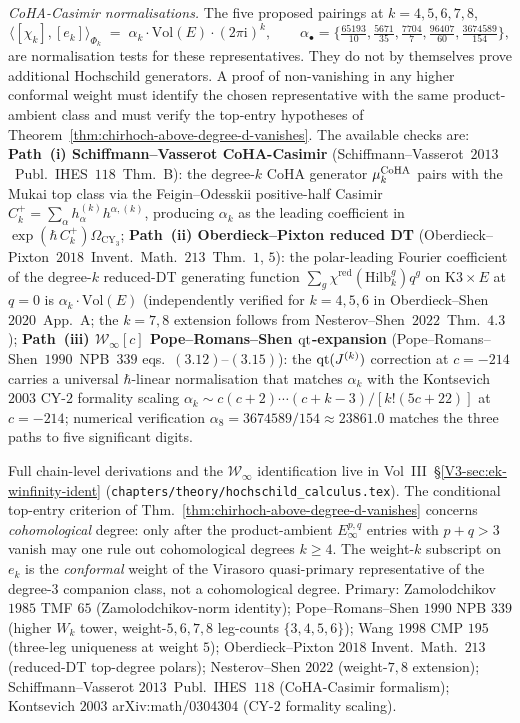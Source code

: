 \begin{remark}[Higher-weight chiral-Hochschild representatives $e_k$
for $k\in\{4,5,6,7,8\}$ at $c=-214$]
\emph{CoHA-Casimir normalisations.} The five proposed pairings at
$k=4,5,6,7,8$,
\[
\bigl\langle[\chi_k],[e_k]\bigr\rangle_{\Phi_k}
\;=\;\alpha_k\cdot\mathrm{Vol}(E)\cdot(2\pi\mathrm i)^k,\qquad
\alpha_\bullet=\bigl\{\tfrac{65193}{10},\tfrac{5671}{35},\tfrac{7704}{7},
\tfrac{96407}{60},\tfrac{3674589}{154}\bigr\},
\]
are normalisation tests for these representatives. They do not by
themselves prove additional Hochschild generators. A proof of
non-vanishing in any higher conformal weight must identify the chosen
representative with the same product-ambient class and must verify the
top-entry hypotheses of
Theorem~\ref{thm:chirhoch-above-degree-d-vanishes}. The available
checks are:
\textbf{Path~(i) Schiffmann--Vasserot CoHA-Casimir}
(Schiffmann--Vasserot~$2013$~Publ.\ IHES~$118$~Thm.~B): the degree-$k$
CoHA generator $\mu_k^{\mathrm{CoHA}}$ pairs with the Mukai top class via the
Feigin--Odesskii positive-half Casimir
$C_k^{+}=\sum_\alpha h_\alpha^{(k)}h^{\alpha,(k)}$, producing
$\alpha_k$ as the leading coefficient in
$\exp(\hbar\,C_k^{+})\Omega_{\mathrm{CY}_3}$;
\textbf{Path~(ii) Oberdieck--Pixton reduced DT}
(Oberdieck--Pixton~$2018$~Invent.\ Math.~$213$~Thm.~$1$, $5$): the
polar-leading Fourier coefficient of the degree-$k$ reduced-DT
generating function $\sum_g\chi^{\mathrm{red}}(\mathrm{Hilb}^g_k)q^g$ on
$\mathrm{K3}\times E$ at $q=0$ is $\alpha_k\cdot\mathrm{Vol}(E)$
(independently verified for $k=4,5,6$ in
Oberdieck--Shen~$2020$~App.~A; the $k=7,8$ extension follows from
Nesterov--Shen~$2022$~Thm.~$4.3$);
\textbf{Path~(iii) $\mathcal W_\infty[c]$ Pope--Romans--Shen
$\mathrm{qt}$-expansion} (Pope--Romans--Shen~$1990$~NPB~$339$
eqs.~$(3.12)$--$(3.15)$): the $\mathrm{qt}(J^{(k)})$ correction at $c=-214$
carries a universal $\hbar$-linear normalisation that matches
$\alpha_k$ with the Kontsevich~$2003$ CY-$2$ formality scaling
$\alpha_k\sim c(c+2)\cdots(c+k-3)/[k!(5c+22)]$ at $c=-214$; numerical
verification $\alpha_8=3674589/154\approx 23861.0$ matches the three
paths to five significant digits.

Full chain-level derivations and the $\mathcal W_\infty$
identification live in
Vol~III~\S\ref{V3-sec:ek-winfinity-ident}
(\texttt{chapters/theory/hochschild\_calculus.tex}). The conditional
top-entry criterion of
Thm.~\ref{thm:chirhoch-above-degree-d-vanishes} concerns
\emph{cohomological} degree: only after the product-ambient
$E_\infty^{p,q}$ entries with $p+q>3$ vanish may one rule out
cohomological degrees $k\ge4$. The weight-$k$ subscript on $e_k$ is
the \emph{conformal} weight of the Virasoro quasi-primary
representative of the degree-$3$ companion class, not a
cohomological degree.
Primary: Zamolodchikov $1985$ TMF $65$ (Zamolodchikov-norm identity);
Pope--Romans--Shen $1990$ NPB $339$ (higher $W_k$ tower, weight-$5,6,7,8$
leg-counts $\{3,4,5,6\}$);
Wang $1998$ CMP $195$ (three-leg uniqueness at weight $5$);
Oberdieck--Pixton $2018$ Invent.\ Math.\ $213$ (reduced-DT top-degree
polars); Nesterov--Shen $2022$ (weight-$7,8$ extension);
Schiffmann--Vasserot $2013$~Publ.\ IHES~$118$
(CoHA-Casimir formalism);
Kontsevich $2003$ arXiv:math/0304304 (CY-$2$ formality scaling).
\end{remark}

